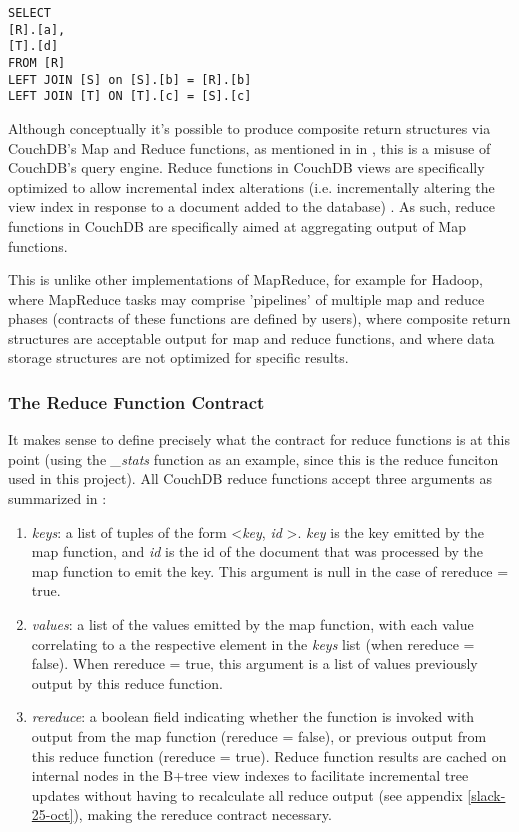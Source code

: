 \begin{verbatim}
SELECT
[R].[a],
[T].[d]
FROM [R]
LEFT JOIN [S] on [S].[b] = [R].[b]
LEFT JOIN [T] ON [T].[c] = [S].[c]
\end{verbatim}

Although conceptually it's possible to produce composite return structures via CouchDB's Map and Reduce functions, as mentioned in in \cite{reduceFunctions}, this is a misuse of CouchDB's query engine. Reduce functions in CouchDB views are specifically optimized to allow incremental index alterations (i.e. incrementally altering the view index in response to a document added to the database) \cite{reduceFunctions}. As such, reduce functions in CouchDB are specifically aimed at aggregating output of Map functions.

This is unlike other implementations of MapReduce, for example for Hadoop, where MapReduce tasks may comprise 'pipelines' of multiple map and reduce phases (contracts of these functions are defined by users), where composite return structures are acceptable output for map and reduce functions, and where data storage structures are not optimized for specific results.

\subsubsection{The Reduce Function Contract}
It makes sense to define precisely what the contract for reduce functions is at this point (using the \textit{\_stats} function as an example, since this is the reduce funciton used in this project). All CouchDB reduce functions accept three arguments as summarized in \cite{reduceFunctions}:

\begin{enumerate}
    \item \textit{keys}: a list of tuples of the form \textless \textit{key}, \textit{id} \textgreater. \textit{key} is the key emitted by the map function, and \textit{id} is the id of the document that was processed by the map function to emit the key. This argument is null in the case of rereduce = true.
    \item \textit{values}: a list of the values emitted by the map function, with each value correlating to a the respective element in the \textit{keys} list (when rereduce = false). When rereduce = true, this argument is a list of values previously output by this reduce function.
    \item \textit{rereduce}: a boolean field indicating whether the function is invoked with output from the map function (rereduce = false), or previous output from this reduce function (rereduce = true). Reduce function results are cached on internal nodes in the B+tree view indexes to facilitate incremental tree updates without having to recalculate all reduce output (see appendix \ref{slack-25-oct}), making the rereduce contract necessary.
\end{enumerate}

